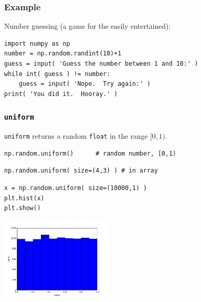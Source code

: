 \documentclass[11pt]{beamer}
\begin{document}
\begin{frame}[fragile]
  \frametitle{Example}
  \Enlarge

  \begin{enumerate}
  \myitem  Number guessing (a game for the easily entertained):
  \end{enumerate}
  \begin{Verbatim}
import numpy as np
number = np.random.randint(10)+1
guess = input( 'Guess the number between 1 and 10:' )
while int( guess ) != number:
    guess = input( 'Nope.  Try again:' )
print( 'You did it.  Hooray.' )
  \end{Verbatim}
\end{frame}

\begin{frame}[fragile]
  \frametitle{\texttt{uniform}}
  \Enlarge

  \begin{enumerate}
  \myitem  \texttt{uniform} returns a random \texttt{float} in the range $[0,1)$.
  \end{enumerate}
  \begin{Verbatim}
np.random.uniform()      # random number, [0,1)
  \end{Verbatim}
  \begin{Verbatim}
np.random.uniform( size=(4,3) ) # in array
  \end{Verbatim}
  \begin{Verbatim}
x = np.random.uniform( size=(10000,1) )
plt.hist(x)
plt.show()
  \end{Verbatim}
  \includegraphics[width=0.4\textwidth]{./img/hist-uniform.png}
\end{frame}
\end{document}
